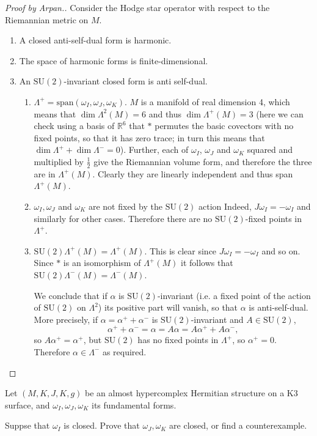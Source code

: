 \begin{proof}[Proof by Arpan.]
Consider the Hodge star operator with respect
to the Riemannian metric on $M$.
\begin{enumerate}
\item A closed anti-self-dual form is
harmonic.
\item The space of harmonic forms is
finite-dimensional.
\item An $\text{SU}(2)$-invariant closed form
is
anti self-dual.
\begin{enumerate}
\item
$\Lambda^+=\text{span}(\omega_I,\omega_J,
\omega_K)$.
$M$ is a manifold of real dimension 4,
which means that $\dim\Lambda^2(M)=6$ and
thus
$\dim\Lambda^+(M)=3$
(here we can check using a basis of
$\mathbb{R}^6$
that $*$ permutes the basic covectors with no
fixed points,
so that it has zero trace;
in turn this means that $\dim \Lambda^+ +
\dim\Lambda^-=0$).
Further, each of $\omega_I$, $\omega_J$ and
$\omega_K$
squared and multiplied by $\frac{1}{2}$ give
the Riemannian
volume form, and therefore the three are in
$\Lambda^+(M)$.
Clearly they are linearly independent and
thus span $\Lambda^+(M)$.

\item $\omega_I,\omega_J$ and $\omega_K$ are
not fixed by the
$\text{SU}(2)$ action
Indeed, $J\omega_I=-\omega_I$ and similarly
for other cases. Therefore there are no
$\text{SU}(2)$-fixed
points in $\Lambda^+$.

\item
$\text{SU}(2)\Lambda^+(M)=\Lambda^+(M)$.
This is clear since $J\omega_I = -\omega_I$
and so on.
Since $*$ is an isomorphism of $\Lambda^+(M)$
it follows that
$\text{SU}(2)\Lambda^-(M)=\Lambda^-(M)$.

\medskip\noindent
We conclude that if $\alpha$ is
$\text{SU}(2)$-invariant (i.e. a fixed point
of
the action of $\text{SU}(2)$ on $\Lambda^2$)
its positive part will vanish, so that
$\alpha$ is anti-self-dual. More precisely,
if
$\alpha = \alpha^+ +\alpha^-$ is
$\text{SU}(2)$-invariant and $A \in
\text{SU}(2)$,
$$
\alpha^+ +\alpha^- = \alpha =
A\alpha=A\alpha^+ + A\alpha^-,
$$
so $A\alpha^+=\alpha^+$, but $\text{SU}(2)$
has no fixed points in $\Lambda^+$, so
$\alpha^+=0$.
Therefore $\alpha \in \Lambda^-$ as required.
\end{enumerate}
\end{enumerate}
\end{proof}

\begin{exercise}
\label{exercise-close-funda-forms-almos}
Let $(M,K,J,K,g)$ be an almost hypercomplex
Hermitian structure
on a K3 surface, and $\omega_I, \omega_J,
\omega_K$
its fundamental forms.

Suppse that $\omega_I$ is closed.
Prove that $\omega_J,\omega_K$ are closed, or
find a counterexample.
\end{exercise}

